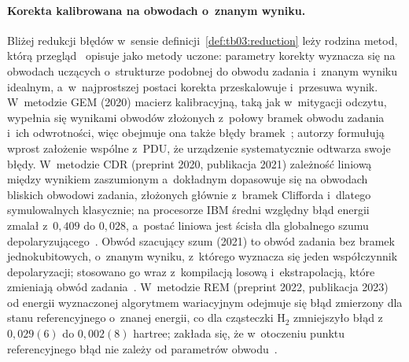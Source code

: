 \paragraph{Korekta kalibrowana na obwodach o~znanym wyniku.}
Bliżej redukcji błędów w~sensie definicji~\ref{def:tb03:reduction} leży rodzina metod, którą przegląd~\cite{cai2023quantum} opisuje jako metody uczone: parametry korekty wyznacza się na obwodach uczących o~strukturze podobnej do obwodu zadania i~znanym wyniku idealnym, a~w~najprostszej postaci korekta przeskalowuje i~przesuwa wynik.
W~metodzie GEM (2020) macierz kalibracyjną, taką jak w~mitygacji odczytu, wypełnia się wynikami obwodów złożonych z~połowy bramek obwodu zadania i~ich odwrotności, więc obejmuje ona także błędy bramek~\cite{jattana_general_2020}; autorzy formułują wprost założenie wspólne z~PDU, że urządzenie systematycznie odtwarza swoje błędy.
W~metodzie CDR (preprint 2020, publikacja 2021) zależność liniową między wynikiem zaszumionym a~dokładnym dopasowuje się na obwodach bliskich obwodowi zadania, złożonych głównie z~bramek Clifforda i~dlatego symulowalnych klasycznie; na procesorze IBM średni względny błąd energii zmalał z~$0{,}409$ do $0{,}028$, a~postać liniowa jest ścisła dla globalnego szumu depolaryzującego~\cite{czarnik_error_2021}.
Obwód szacujący szum (2021) to obwód zadania bez bramek jednokubitowych, o~znanym wyniku, z~którego wyznacza się jeden współczynnik depolaryzacji; stosowano go wraz z~kompilacją losową i~ekstrapolacją, które zmieniają obwód zadania~\cite{urbanek_mitigating_2021}.
W~metodzie REM (preprint 2022, publikacja 2023) od energii wyznaczonej algorytmem wariacyjnym odejmuje się błąd zmierzony dla stanu referencyjnego o~znanej energii, co dla cząsteczki H$_2$ zmniejszyło błąd z~$0{,}029(6)$ do $0{,}002(8)$ hartree; zakłada się, że w~otoczeniu punktu referencyjnego błąd nie zależy od parametrów obwodu~\cite{lolur_reference-state_2023}.

